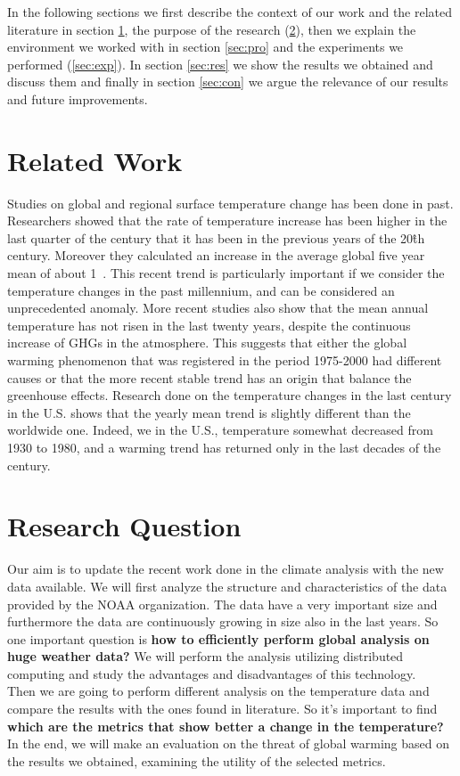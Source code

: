 \documentclass{vldb}
\begin{document}
In the following sections we first describe the context of our work and the related literature in section \ref{sec:rel}, the purpose of the research (\ref{sec:question}), then we explain the environment we worked with in section \ref{sec:pro} and the experiments we performed (\ref{sec:exp}). In section \ref{sec:res} we show the results we obtained and discuss them and finally in section \ref{sec:con} we argue the relevance of our results and future improvements.


\section{Related Work}
\label{sec:rel}
Studies on global and regional surface temperature change has been done in past. Researchers showed that the rate of temperature increase has been higher in the last quarter of the century that it has been in the previous years of the 20\^{th} century. Moreover they calculated an increase in the average global five year mean of about 1\celsius~\cite{hansen1999giss}. This recent trend is particularly important if we consider the temperature changes in the past millennium, and can be considered an unprecedented anomaly\cite{mann1999northern}. More recent studies also show that the mean annual temperature has not risen in the last twenty years, despite the continuous increase of GHGs in the atmosphere\cite{kosaka2013recent}. This suggests that either the global warming phenomenon that was registered in the period 1975-2000 had different causes or that the more recent stable trend has an origin that balance the greenhouse effects.
Research done on the temperature changes in the last century in the U.S. shows that the yearly mean trend is slightly different than the worldwide one. Indeed, we in the U.S., temperature somewhat decreased from 1930 to 1980, and a warming trend has returned only in the last decades of the century\cite{hansen1999giss}.  

\section{Research Question}
\label{sec:question}
Our aim is to update the recent work done in the climate analysis with the new data available. We will first analyze the structure and characteristics of the data provided by the NOAA organization.
The data have a very important size and furthermore the data are continuously growing in size also in the last years. So one important question is \textbf{how to efficiently perform global analysis on huge weather data?} We will perform the analysis utilizing distributed computing and study the advantages and disadvantages of this technology.\\
Then we are going to perform different analysis on the temperature data and compare the results with the ones found in literature. So it's important to find \textbf{which are the metrics that show better a change in the temperature?} In the end, we will make an evaluation on the threat of global warming based on the results we obtained, examining the utility of the selected metrics. \\
\end{document}
